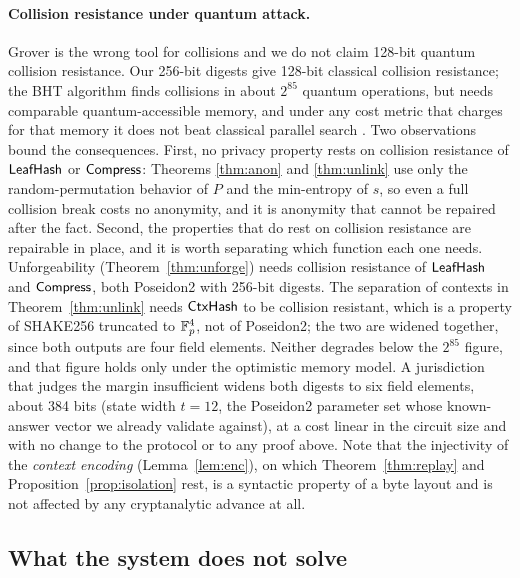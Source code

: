 \documentclass[11pt]{article}
\theoremstyle{definition}
\begin{document}
\paragraph{Collision resistance under quantum attack.} Grover is the wrong tool for
collisions and we do not claim 128-bit quantum collision resistance. Our 256-bit digests
give 128-bit classical collision resistance; the BHT algorithm \cite{bht} finds collisions
in about $2^{85}$ quantum operations, but needs comparable quantum-accessible memory, and
under any cost metric that charges for that memory it does not beat classical parallel
search \cite{bernsteincoll}. Two observations bound the consequences. First, no privacy
property rests on collision resistance of $\mathsf{LeafHash}$ or $\mathsf{Compress}$: Theorems
\ref{thm:anon} and \ref{thm:unlink} use only the random-permutation behavior of $P$ and
the min-entropy of $s$, so even a full collision break costs no anonymity, and it is
anonymity that cannot be repaired after the fact. Second, the properties that do rest on
collision resistance are repairable in place, and it is worth separating which function
each one needs. Unforgeability (Theorem~\ref{thm:unforge}) needs collision resistance of
$\mathsf{LeafHash}$ and $\mathsf{Compress}$, both Poseidon2 with 256-bit digests. The separation of
contexts in Theorem~\ref{thm:unlink} needs $\mathsf{CtxHash}$ to be collision resistant, which is
a property of SHAKE256 truncated to $\mathbb{F}_p^4$, not of Poseidon2; the two are widened
together, since both outputs are four field elements. Neither degrades below the $2^{85}$
figure, and that figure holds only under the optimistic memory model. A jurisdiction that
judges the margin insufficient widens both digests to six field elements, about 384 bits
(state width $t = 12$, the Poseidon2 parameter set whose known-answer vector we already
validate against), at a cost linear in the circuit size and with no change to the protocol
or to any proof above. Note that the injectivity of the \emph{context encoding}
(Lemma~\ref{lem:enc}), on which Theorem~\ref{thm:replay} and
Proposition~\ref{prop:isolation} rest, is a syntactic property of a byte layout and is not
affected by any cryptanalytic advance at all.

\subsection{What the system does not solve}
\label{sec:limits}
\end{document}
